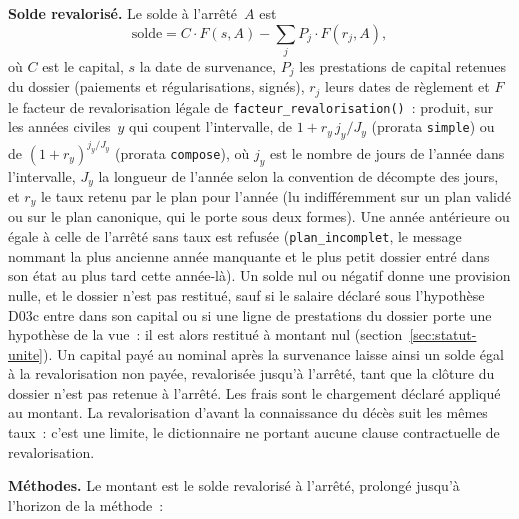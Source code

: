 \documentclass[a4paper,11pt]{article}
\newcommand{\code}[1]{\texttt{\small #1}}
\begin{document}
\textbf{Solde revalorisé.} Le solde à l'arrêté~$A$ est
\[
\text{solde} = C \cdot F(s, A) - \sum_j P_j \cdot F(r_j, A),
\]
où $C$ est le capital, $s$ la date de survenance, $P_j$ les prestations de
capital retenues du dossier (paiements et régularisations, signés), $r_j$
leurs dates de règlement et $F$ le facteur de revalorisation légale de
\code{facteur\_revalorisation()}~: produit, sur les années civiles~$y$ qui
coupent l'intervalle, de $1 + r_y\, j_y / J_y$ (prorata \code{simple}) ou
de $(1 + r_y)^{j_y / J_y}$ (prorata \code{compose}), où $j_y$ est le
nombre de jours de l'année dans l'intervalle, $J_y$ la longueur de l'année
selon la convention de décompte des jours, et $r_y$ le taux retenu par le
plan pour l'année (lu indifféremment sur un plan validé ou sur le plan
canonique, qui le porte sous deux formes). Une année antérieure ou égale à celle de l'arrêté sans
taux est refusée (\code{plan\_incomplet}, le message nommant la plus ancienne année
manquante et le plus petit dossier entré dans son état au plus tard cette
année-là). Un solde nul ou négatif donne une provision nulle, et le
dossier n'est pas restitué, sauf si le salaire déclaré sous l'hypothèse
D03c entre dans son capital ou si une ligne de prestations du dossier
porte une hypothèse de la vue~: il est alors restitué à montant nul
(section~\ref{sec:statut-unite}). Un capital payé au nominal après la
survenance laisse ainsi un solde égal à la revalorisation non payée,
revalorisée jusqu'à l'arrêté, tant que la clôture du dossier n'est pas
retenue à l'arrêté. Les frais sont le chargement déclaré appliqué
au montant. La revalorisation d'avant la connaissance du décès suit les
mêmes taux~: c'est une limite, le dictionnaire ne portant aucune clause
contractuelle de revalorisation.

\textbf{Méthodes.} Le montant est le solde revalorisé à l'arrêté, prolongé
jusqu'à l'horizon de la méthode~:
\end{document}
